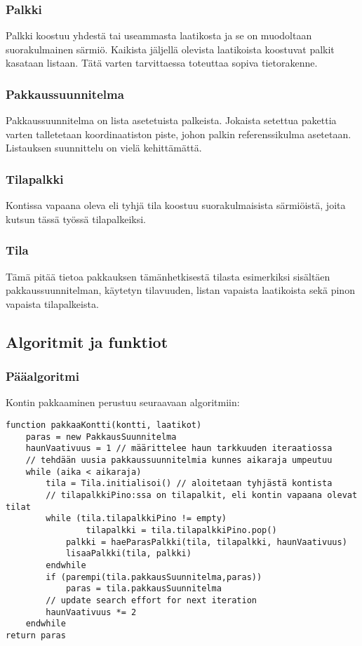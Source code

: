 \documentclass[a4paper,12pt, titlepage]{article}
\begin{document}
\subsubsection*{Palkki}
Palkki koostuu yhdestä tai useammasta laatikosta ja se on muodoltaan suorakulmainen särmiö. Kaikista jäljellä olevista laatikoista koostuvat palkit kasataan listaan. Tätä varten tarvittaessa toteuttaa sopiva tietorakenne.
\subsubsection*{Pakkaussuunnitelma}
Pakkaussuunnitelma on lista asetetuista palkeista. Jokaista setettua pakettia varten talletetaan koordinaatiston piste, johon palkin referenssikulma asetetaan. Listauksen suunnittelu on vielä kehittämättä.
\subsubsection*{Tilapalkki}
Kontissa vapaana oleva eli tyhjä tila koostuu suorakulmaisista särmiöistä, joita kutsun tässä työssä tilapalkeiksi.
\subsubsection*{Tila}
Tämä pitää tietoa pakkauksen tämänhetkisestä tilasta esimerkiksi sisältäen pakkaussuunnitelman, käytetyn tilavuuden, listan vapaista laatikoista sekä pinon vapaista tilapalkeista.
\subsection*{Algoritmit ja funktiot}
\subsubsection*{Pääalgoritmi}
Kontin pakkaaminen perustuu seuraavaan algoritmiin:
\begin{verbatim}
function pakkaaKontti(kontti, laatikot) 
    paras = new PakkausSuunnitelma        
    haunVaativuus = 1 // määrittelee haun tarkkuuden iteraatiossa
    // tehdään uusia pakkaussuunnitelmia kunnes aikaraja umpeutuu
    while (aika < aikaraja)
        tila = Tila.initialisoi() // aloitetaan tyhjästä kontista
        // tilapalkkiPino:ssa on tilapalkit, eli kontin vapaana olevat tilat
        while (tila.tilapalkkiPino != empty)
        	    tilapalkki = tila.tilapalkkiPino.pop()
            palkki = haeParasPalkki(tila, tilapalkki, haunVaativuus)
            lisaaPalkki(tila, palkki)
        endwhile
        if (parempi(tila.pakkausSuunnitelma,paras))
            paras = tila.pakkausSuunnitelma
        // update search effort for next iteration                  	
        haunVaativuus *= 2
    endwhile
return paras
\end{verbatim}
\end{document}
